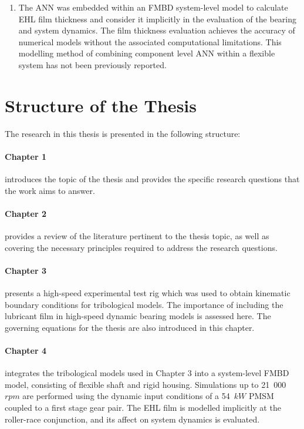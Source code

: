 \begin{enumerate}
	\item The ANN was embedded within an FMBD system-level model to calculate EHL film thickness and consider it implicitly in the evaluation of the bearing and system dynamics. The film thickness evaluation achieves the accuracy of numerical models without the associated computational limitations. This modelling method of combining component level ANN within a flexible system has not been previously reported.
\end{enumerate}

\section{Structure of the Thesis} \label{Structure of Thesis}

The research in this thesis is presented in the following structure:

\paragraph{Chapter 1} introduces the topic of the thesis and provides the specific research questions that the work aims to answer.

\paragraph{Chapter 2} provides a review of the literature pertinent to the thesis topic, as well as covering the necessary principles required to address the research questions.

\paragraph{Chapter 3} presents a high-speed experimental test rig which was used to obtain kinematic boundary conditions for tribological models. The importance of including the lubricant film in high-speed dynamic bearing models is assessed here. The governing equations for the thesis are also introduced in this chapter.

\paragraph{Chapter 4} integrates the tribological models used in Chapter 3 into a system-level FMBD model, consisting of flexible shaft and rigid housing. Simulations up to 21~000~$rpm$ are performed using the dynamic input conditions of a 54~$kW$ PMSM coupled to a first stage gear pair. The EHL film is modelled implicitly at the roller-race conjunction, and its affect on system dynamics is evaluated.

